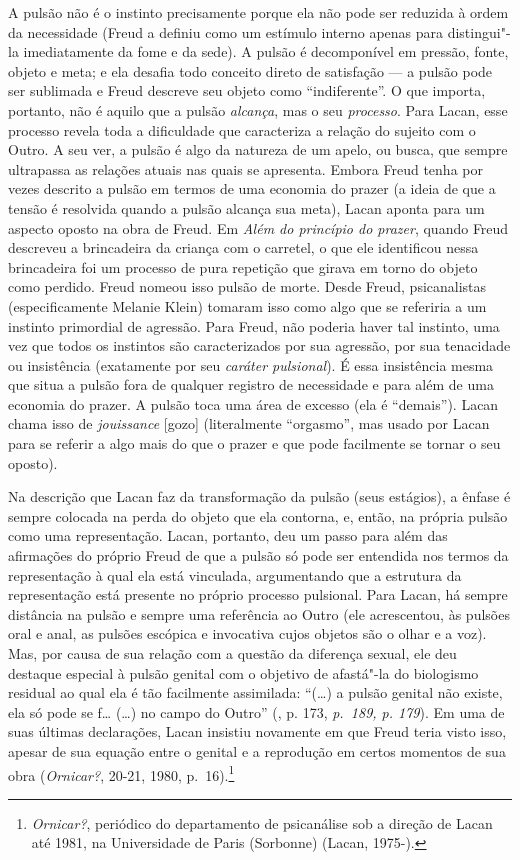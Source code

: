 A pulsão não é o instinto precisamente porque ela não pode ser reduzida
à ordem da necessidade (Freud a definiu como um estímulo interno apenas
para distingui"-la imediatamente da fome e da sede). A pulsão é
decomponível em pressão, fonte, objeto e meta; e ela desafia todo
conceito direto de satisfação --- a pulsão pode ser sublimada e Freud
descreve seu objeto como ``indiferente''. O que importa, portanto, não é
aquilo que a pulsão \emph{alcança}, mas o seu \emph{processo}. Para
Lacan, esse processo revela toda a dificuldade que caracteriza a relação
do sujeito com o Outro. A seu ver, a pulsão é algo da natureza de um
apelo, ou busca, que sempre ultrapassa as relações atuais nas quais se
apresenta. Embora Freud tenha por vezes descrito a pulsão em termos de
uma economia do prazer (a ideia de que a tensão é resolvida quando a
pulsão alcança sua meta), Lacan aponta para um aspecto oposto na obra de
Freud. Em \emph{Além do princípio do prazer}, quando Freud descreveu a
brincadeira da criança com o carretel, o que ele identificou nessa
brincadeira foi um processo de pura repetição que girava em torno do
objeto como perdido. Freud nomeou isso pulsão de morte. Desde Freud,
psicanalistas (especificamente Melanie Klein) tomaram isso como algo que
se referiria a um instinto primordial de agressão. Para Freud, não
poderia haver tal instinto, uma vez que todos os instintos são
caracterizados por sua agressão, por sua tenacidade ou insistência
(exatamente por seu \emph{caráter pulsional}). É essa insistência mesma
que situa a pulsão fora de qualquer registro de necessidade e para além
de uma economia do prazer. A pulsão toca uma área de excesso (ela é
``demais''). Lacan chama isso de \emph{jouissance} {[}gozo{]}
(literalmente ``orgasmo'', mas usado por Lacan para se referir a algo
mais do que o prazer e que pode facilmente se tornar o seu oposto).

Na descrição que Lacan faz da transformação da pulsão (seus estágios), a
ênfase é sempre colocada na perda do objeto que ela contorna, e, então,
na própria pulsão como uma representação. Lacan, portanto, deu um passo
para além das afirmações do próprio Freud de que a pulsão só pode ser
entendida nos termos da representação à qual ela está vinculada,
argumentando que a estrutura da representação está presente no próprio
processo pulsional. Para Lacan, há sempre distância na pulsão e sempre
uma referência ao Outro (ele acrescentou, às pulsões oral e anal, as
pulsões escópica e invocativa cujos objetos são o olhar e a voz). Mas,
por causa de sua relação com a questão da diferença sexual, ele deu
destaque especial à pulsão genital com o objetivo de afastá"-la do
biologismo residual ao qual ela é tão facilmente assimilada: ``(\ldots{}) a
pulsão genital não existe, ela só pode se f\ldots{} (\ldots{}) no campo do Outro''
(, p. 173, \emph{p.~189, p. 179}). Em uma de suas últimas declarações,
Lacan insistiu novamente em que Freud teria visto isso, apesar de sua
equação entre o genital e a reprodução em certos momentos de sua obra
(\emph{Ornicar?}, 20-21, 1980, p.~16).\footnote{\emph{Ornicar?},
  periódico do departamento de psicanálise sob a direção de Lacan até
  1981, na Universidade de Paris  (Sorbonne) (Lacan, 1975-).} %

